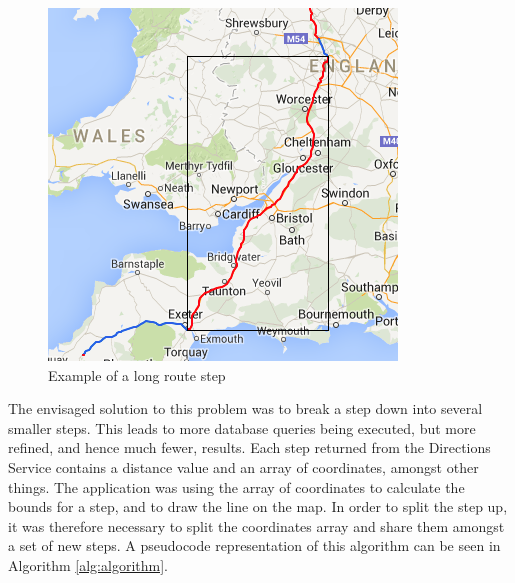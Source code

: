 \documentclass[authoryearcitations]{UoYCSproject}
\begin{document}
\begin{figure}
	\center
	\includegraphics[scale=0.7]{longroutestep}
	\caption{Example of a long route step}
	\label{fig:longroutestep}
\end{figure}

The envisaged solution to this problem was to break a step down into several smaller steps. This leads to more database queries being executed, but more refined, and hence much fewer, results. Each step returned from the Directions Service contains a distance value and an array of coordinates, amongst other things. The application was using the array of coordinates to calculate the bounds for a step, and to draw the line on the map. In order to split the step up, it was therefore necessary to split the coordinates array and share them amongst a set of new steps. A pseudocode representation of this algorithm can be seen in Algorithm \autoref{alg:algorithm}.
\end{document}
